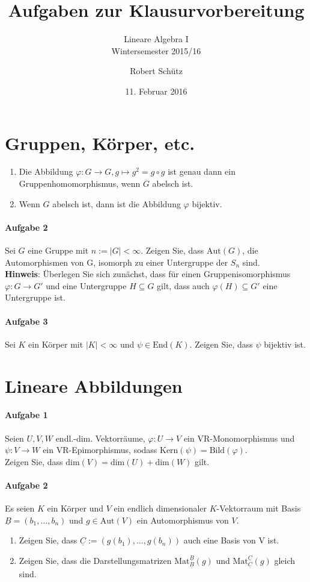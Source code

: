 \documentclass{scrartcl}
\title{Aufgaben zur Klausurvorbereitung}
\subtitle{Lineare Algebra I\\Wintersemester 2015/16}
\author{Robert Schütz}
\date{11. Februar 2016}
\begin{document}
	\pagestyle{scrheadings}
	\maketitle
	\section{Gruppen, Körper, etc.}
	\begin{enumerate}[label=(\alph*)]
		\item Die Abbildung $\varphi:G\to G, g\mapsto g^2=g\circ g$
			ist genau dann ein Gruppenhomomorphismus, wenn $G$ abelsch ist.
		\item Wenn $G$ abelsch ist, dann ist die Abbildung $\varphi$  bijektiv.
	\end{enumerate}
	\paragraph{Aufgabe 2}
	Sei $G$ eine Gruppe mit $n:=\vert G\vert<\infty$. Zeigen Sie, dass $\text{Aut}(G)$,
	die Automorphismen von G, isomorph zu einer Untergruppe der $S_n$ sind.\\
	\textbf{Hinweis}: Überlegen Sie sich zunächst, dass für einen Gruppenisomorphismus
	$\varphi: G\to G'$ und eine Untergruppe $H\subseteq G$ gilt,
	dass auch $\varphi(H)\subseteq G'$ eine Untergruppe ist.
	\paragraph{Aufgabe 3}
	Sei $K$ ein Körper mit $\vert K\vert<\infty$ und $\psi\in\text{End}(K)$.
	Zeigen Sie, dass $\psi$ bijektiv ist.
	\section{Lineare Abbildungen}
	\paragraph{Aufgabe 1}
	Seien $U, V, W$ endl.-dim. Vektorräume, $\varphi: U\to V$ ein VR-Monomorphismus
	und $\psi: V\to W$ ein VR-Epimorphismus, sodass $\text{Kern}(\psi)=\text{Bild}(\varphi)$.\\
	Zeigen Sie, dass $\text{dim}(V)=\text{dim}(U)+\text{dim}(W)$ gilt.
	\paragraph{Aufgabe 2}
	Es seien $K$ ein Körper und $V$ ein endlich dimensionaler $K$-Vektorraum
	mit Basis $\underline{B}=(b_1,\dots,b_n)$
	und $g\in\text{Aut}(V)$ ein Automorphismus von $V$.
	\begin{enumerate}[label=(\alph*)]
		\item Zeigen Sie, dass $\underline{C}:=(g(b_1),\dots,g(b_n))$ auch eine Basis von V ist.
		\item Zeigen Sie, dass die Darstellungsmatrizen
			$\text{Mat}_{\underline{B}}^{\underline{B}}(g)$
			und $\text{Mat}_{\underline{C}}^{\underline{C}}(g)$ gleich sind.
	\end{enumerate}
\end{document}
